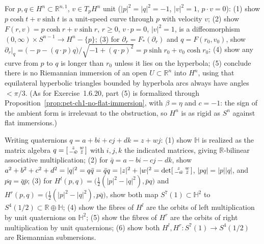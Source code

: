 \begin{remark}
  \label{rem:pet-ch1-ex-21}
  \leanok
  For $p,q\in H^n\subset\mathbb{R}^{n,1}$, $v\in T_pH^n$ unit ($|p|^2=|q|^2=-1$,
  $|v|^2=1$, $p\cdot v=0$): (1) show $p\cosh t+v\sinh t$ is a unit-speed curve
  through $p$ with velocity $v$; (2) show $F(r,v)=p\cosh r+v\sinh r$, $r\ge0$,
  $v\cdot p=0$, $|v|^2=1$, is a diffeomorphism $(0,\infty)\times S^{n-1}\to H^n-\{p\}$;
  (3) for $\partial_r=F_*(\partial_r)$ and $q=F(r_0,v_0)$, show
  $\partial_r|_q=\big(-p-(q\cdot p)q\big)/\sqrt{-1+(q\cdot p)^2}=p\sinh r_0+v_0\cosh r_0$;
  (4) show any curve from $p$ to $q$ is longer than $r_0$ unless it lies on the
  hyperbola; (5) conclude there is no Riemannian immersion of an open
  $U\subset\mathbb{R}^n$ into $H^n$, using that equilateral hyperbolic triangles
  bounded by hyperbola arcs always have angles $<\pi/3$. (As for
  Exercise~1.6.20, part (5) is formalized through
  Proposition~\ref{prop:pet-ch1-no-flat-immersion}, with $\beta=\eta$ and
  $c=-1$: the sign of the ambient form is irrelevant to the obstruction, so
  $H^n$ is as rigid as $S^n$ against flat immersions.)
\end{remark}

\begin{remark}
  \label{rem:pet-ch1-ex-22}
  \leanok
  Writing quaternions $q=a+bi+cj+dk=z+wj$: (1) show $\mathbb{H}$ is realized as the
  matrix algebra $q=\begin{bsmallmatrix}z&w\\-\bar w&\bar z\end{bsmallmatrix}$ with
  $i,j,k$ the indicated matrices, giving $\mathbb{R}$-bilinear associative
  multiplication; (2) for $\bar q=a-bi-cj-dk$, show
  $a^2+b^2+c^2+d^2=|q|^2=q\bar q=\bar qq=|z|^2+|w|^2=\det\begin{bsmallmatrix}z&w\\-\bar w&\bar z\end{bsmallmatrix}$,
  $|pq|=|p||q|$, and $\overline{pq}=\bar q\bar p$; (3) for
  $H^l(p,q)=\big(\tfrac12(|p|^2-|q|^2),\bar pq\big)$ and
  $H^r(p,q)=\big(\tfrac12(|p|^2-|q|^2),p\bar q\big)$, show both map
  $S^7(1)\subset\mathbb{H}^2$ to $S^4(1/2)\subset\mathbb{R}\oplus\mathbb{H}$; (4) show the fibres of
  $H^l$ are the orbits of left multiplication by unit quaternions on $\mathbb{H}^2$;
  (5) show the fibres of $H^r$ are the orbits of right multiplication by unit
  quaternions; (6) show both $H^l,H^r:S^7(1)\to S^4(1/2)$ are Riemannian
  submersions.
\end{remark}

